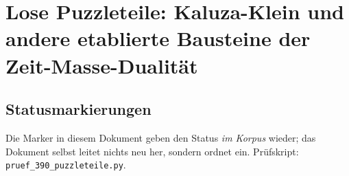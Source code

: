
\providecommand{\BM}{\textbf{[B]}}
\providecommand{\KM}{\textbf{[K]}}
\providecommand{\SM}{\textbf{[S]}}
\providecommand{\XM}{\textbf{[X]}}
\providecommand{\QM}{\textbf{[Q]}}
\providecommand{\EM}{\textbf{[E]}}
\providecommand{\SetzM}{\textbf{[SETZUNG]}}

\chapter*{Lose Puzzleteile: Kaluza-Klein und andere etablierte Bausteine der Zeit-Masse-Dualität}

\begin{abstract}
Wer $\tilde T\cdot m=1$ zum ersten Mal sieht, erkennt darin oft etwas Bekanntes, am häufigsten
Kaluza-Klein. Das ist kein Einwand, sondern ein Befund: Fast jeder Baustein der FFGFT liegt seit
Jahrzehnten in der Literatur, allerdings verstreut über Relativitätstheorie,
Quantenmechanik, Gruppentheorie, Stringtheorie, Zahlentheorie und Phänomenologie. Dieses Dokument
ordnet elf solcher Bausteine ein: Kaluza-Klein, de Broglies innere Uhr und die Compton-Zeit, die
Zitterbewegung, Paulis Einwand gegen einen Zeitoperator, die relationalen Zeitansätze, Wigners
Masse als Casimir-Invariante, den Casimir-Wert der $SU(3)$, die Heaviside-Lorentz-Einheiten, die
Orbifold-Kompaktifizierung, die endlichen Körper mit ihrem Frobenius-Automorphismus und die
Koide-Formel. Zu jedem Baustein wird festgehalten, was er bereits enthielt, welches Stück fehlte
und an welcher Stelle des Korpus er sich einfügt. Wichtig ist die Reihenfolge: Diese Bausteine
waren nicht die Grundlage der FFGFT. Die Theorie entstand unabhängig von ihnen aus der Beziehung
$\tilde T\cdot m=1$; die Bausteine fanden sich erst nachträglich in der Literatur und fügen sich
in ein Bild, das ohne sie gezeichnet wurde. Das Ergebnis ist eine Karte der Stellen, an denen die
Theorie bereits hätte gefunden werden können.
\end{abstract}

\section*{Statusmarkierungen}

Die Marker in diesem Dokument geben den Status \emph{im Korpus} wieder; das Dokument selbst leitet
nichts neu her, sondern ordnet ein. Prüfskript: \texttt{pruef\_390\_puzzleteile.py}.

